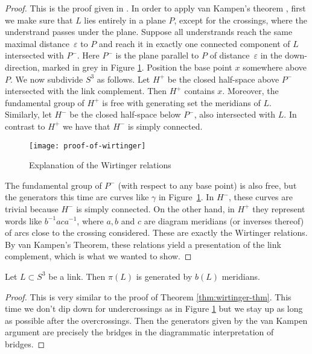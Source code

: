 \documentclass[main.tex]{subfiles}
\begin{document}
\begin{proof}
This is the proof given in \cite{rolfsen2003}. In order to apply van Kampen's theorem \cite{hatcher2002}, first we make sure that $L$ lies entirely in a plane $P$, except for the crossings, where the understrand passes under the plane. Suppose all understrands reach the same maximal distance~$\varepsilon$ to $P$ and reach it in exactly one connected component of $L$ intersected with $P^{-}$. Here $P^-$ is the plane parallel to $P$ of distance~$\varepsilon$ in the down-direction, marked in grey in Figure \ref{fig:proof-of-wirtinger}.
Position the base point $x$ somewhere above $P$. We now subdivide $S^3$ as follows.
Let $H^+$ be the closed half-space above $P^-$ intersected with the link complement. Then $H^+$ contains $x$. Moreover, the fundamental group of $H^+$ is free with generating set the meridians of $L$. Similarly, let $H^-$ be the closed half-space below $P^-$, also intersected with $L$. In contrast to $H^+$ we have that $H^-$ is simply connected.


\begin{figure}[htb]
\centering
\texttt{[image: proof-of-wirtinger]}
\caption{Explanation of the Wirtinger relations}
\label{fig:proof-of-wirtinger}
\end{figure}


The fundamental group of $P^-$ (with respect to any base point) is also free, but the generators this time are curves like $\gamma$ in Figure~\ref{fig:proof-of-wirtinger}. In $H^-$, these curves are trivial because $H^-$ is simply connected. On the other hand, in $H^+$ they represent words like $b^{-1}aca^{-1}$, where $a, b$ and $c$ are diagram meridians (or inverses thereof) of arcs close to the crossing considered. These are exactly the Wirtinger relations.
By van Kampen's Theorem, these relations yield a presentation of the link complement, which is what we wanted to show.
\end{proof}

\begin{theorem}\label{thm:mr<=b}
Let $L \subset S^3$ be a link. Then $\pi(L)$ is generated by $b(L)$ meridians.
\end{theorem}

\begin{proof}
This is very similar to the proof of Theorem \ref{thm:wirtinger-thm}. This time we don't dip down for undercrossings as in Figure \ref{fig:proof-of-wirtinger} but we stay up as long as possible after the overcrossings. Then the generators given by the van Kampen argument are precisely the bridges in the diagrammatic interpretation of bridges.
\end{proof}
\end{document}

